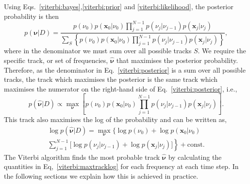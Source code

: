 Using Eqs.~\ref{viterbi:bayes},\ref{viterbi:prior} and
\ref{viterbi:likelihood}, the posterior probability is then
%
\begin{equation}
\label{viterbi:posterior}
    p({\bm \nu} | D) =
    \frac{p(\nu_0)p({\bm x_0} | \nu_0) \displaystyle\prod_{j=1}^{N-1}p(\nu_{j}
| \nu_{j-1})p({\bm x_j} | \nu_j)}{\displaystyle\sum_{S}
\left\{p(\nu_0)p({\bm x_0} | \nu_0)\displaystyle\prod_{j=1}^{N-1}p(\nu_{j} |
\nu_{j-1})p({\bm x_j} | \nu_j)\right\}} ,
\end{equation}
%
where in the denominator we must sum over all possible tracks
$S$. We require the specific track, or set of frequencies, $\hat{\bm
\nu}$ that  maximises the posterior probability. Therefore, as the denominator in Eq.~\ref{viterbi:posterior} is a sum over all possible tracks, the track which maximises the posterior is the same track which
maximises the numerator  on the right-hand side of  Eq.~\ref{viterbi:posterior}, i.e.,
%
\begin{equation}
\label{viterbi:maxtrack}
  p(\hat{\bm \nu} | D) \propto \max_{\bm \nu}{\left[p(\nu_0)p({\bm x_0} |
\nu_0) \prod_{j=1}^{N-1}p(\nu_{j} |\nu_{j-1})p({\bm x_j} | \nu_j)\right]}.
\end{equation}
%
This track also maximises the log of the probability and can be written as,
%
\begin{equation}
\label{viterbi:maxtracklog}
\begin{split}
  \log p(\hat{\bm \nu} | D)  = \max_{{\bm \nu}}{\biggl\{ \log p(\nu_0) + \log p({\bm x_0} | \nu_0)  } \\
 \left. \sum_{j=1}^{N-1} \biggl[ \log p(\nu_{j} | \nu_{j-1}) + \log p({\bm x_j}
| \nu_j) \biggr] \right\} + \text{const}.
  \end{split}
\end{equation}
%
The Viterbi algorithm finds the most probable track $\hat{\bm \nu}$ by calculating the quantities in Eq,~\ref{viterbi:maxtracklog} for each frequency at each time step. In the following sections we explain how this is achieved in practice.

